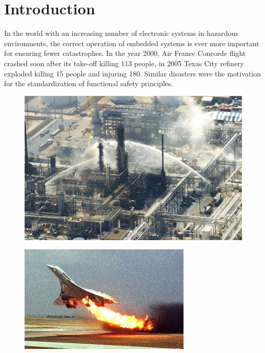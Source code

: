\chapter*{Introduction} %

In the world with an increasing number of electronic systems in hazardous environments, the correct operation of embedded systems is ever more important for ensuring fewer catastrophes. In the year 2000, Air France Concorde flight crashed soon after its take-off killing 113 people, in 2005 Texas City refinery exploded killing 15 people and injuring 180. Similar disasters were the motivation for the standardization of functional safety principles. 

\begin{figure}[H]
    \centering
    \begin{minipage}{.5\textwidth}
          \centering
          \includegraphics[width=.7\linewidth]{images/texas_refinery.jpg}
          \label{fig:texas_refinery}
    \end{minipage}%
    \begin{minipage}{.5\textwidth}
          \centering
          \includegraphics[width=.74\linewidth]{images/concorde_disaster.jpg}
          \label{fig:concorde_disaster}
    \end{minipage}
\end{figure}

